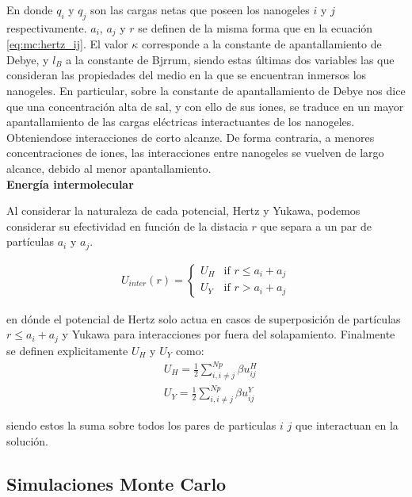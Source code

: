 	\noindent En donde $q_i$ y $q_j$ son las cargas netas que poseen los nanogeles $i$ y $j$ respectivamente. $a_i$, $a_j$ y $r$ se definen de la misma forma que en la ecuaci\'on \ref{eq:mc:hertz_ij}. El valor $\kappa$ corresponde a la constante de apantallamiento de Debye, y $l_B$ a la constante de Bjrrum, siendo estas \'ultimas dos variables las que consideran las propiedades del medio en la que se encuentran inmersos los nanogeles. 
	En particular, sobre la constante de apantallamiento de Debye nos dice que una concentraci\'on alta de sal, y con ello de sus iones, se traduce en un mayor apantallamiento de las cargas el\'ectricas interactuantes de los nanogeles.  Obteniendose interacciones de corto alcanze.
	De forma contraria, a menores concentraciones de iones, las interacciones entre nanogeles se vuelven de largo alcance, debido al menor apantallamiento.\\
	
	\textbf{Energ\'ia intermolecular}
	
	Al considerar la naturaleza de cada potencial, Hertz y Yukawa, podemos considerar su efectividad en funci\'on de la distacia $r$ que separa a un par de part\'iculas $a_i$ y $a_j$.
	
	\begin{align}
		U_{inter}(r) = \begin{cases} U_H  & \text{if } r \leq a_i + a_j \\ U_Y & \text{if } r > a_i + a_j \end{cases} 
		\label{eq:mc:HY-potential}
	\end{align}
	
	\noindent en d\'onde el potencial de Hertz solo actua en casos de superposici\'on de part\'iculas $r \leq a_i + a_j$ y Yukawa para interacciones por fuera del solapamiento.
	Finalmente se definen explicitamente $U_H$ y $U_Y$ como:
	\begin{align}
		& U_H =\frac{1}{2} \sum^{Np}_{i,i \neq j} \beta u^H_{ij} \\
		& U_Y = \frac{1}{2} \sum^{Np}_{i,i \neq j} \beta u^Y_{ij}
	\end{align}
	
	\noindent siendo estos la suma sobre todos los pares de particulas $i$ $j$ que interactuan en la soluci\'on.
	
	
	\subsection{Simulaciones Monte Carlo} \label{sec:mc:mc}
	
